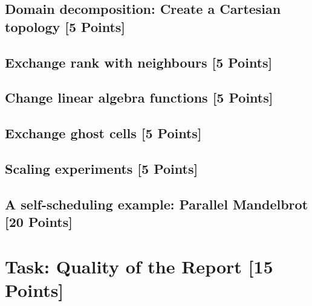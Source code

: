 \documentclass[unicode,11pt,a4paper,oneside,numbers=endperiod,openany]{scrartcl}
\begin{document}
\subsection{Domain decomposition: Create a Cartesian topology [5 Points]}

\subsection{Exchange rank with neighbours [5 Points]}

\subsection{Change linear algebra functions [5 Points]}

\subsection{Exchange ghost cells [5 Points]}

\subsection{Scaling experiments [5 Points]}

\subsection{A self-scheduling example: Parallel Mandelbrot [20 Points]}


\section{Task:  Quality of the Report [15 Points]}
\end{document}
